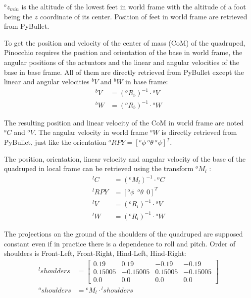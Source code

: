 \documentclass[a4paper,11pt]{article}
\newcommand{\fM}[2]{{}^{#1}\!M_{#2}}
\begin{document}

${}^o\!z_{min}$ is the altitude of the lowest feet in world frame with the altitude of a foot being the $z$ coordinate of its center. Position of feet in world frame are retrieved from PyBullet.

 
To get the position and velocity of the center of mass (CoM) of the quadruped, Pinocchio requires the position and orientation of the base in world frame, the angular positions of the actuators and the linear and angular velocities of the base in base frame. All of them are directly retrieved from PyBullet except the linear and angular velocities ${}^b\!V$ and ${}^b\!W$ in base frame: %
\begin{align}
{}^bV &= ({}^o\!R_b)^{-1} \cdot {}^oV \\
{}^bW &= ({}^o\!R_b)^{-1} \cdot {}^oW
\end{align}  

The resulting position and linear velocity of the CoM in world frame are noted ${}^o\!C$ and ${}^o\!V$. The angular velocity in world frame ${}^oW$ is directly retrieved from PyBullet, just like the orientation ${}^o\!RPY = [{}^o\!\phi ~ {}^o\!\theta ~ {}^o\!\psi]^T$.

The position, orientation, linear velocity and angular velocity of the base of the quadruped in local frame can be retrieved using the transform $\fM{o}{l}$ :
\begin{align}
{}^l\!C &= (\fM{o}{l})^{-1} \cdot {}^o\!C \\
{}^l\!RPY &= [{}^o\phi~~{}^o\theta~~0]^T \\
{}^l\!V &= ({}^o\!R_l)^{-1} \cdot {}^o\!V \\
{}^l\!W &= ({}^o\!R_l)^{-1} \cdot {}^o\!W
\end{align}

The projections on the ground of the shoulders of the quadruped are supposed constant even if in practice there is a dependence to roll and pitch. Order of shoulders is Front-Left, Front-Right, Hind-Left, Hind-Right:
\begin{align}
{}^l\!shoulders &= \begin{bmatrix} 0.19 & 0.19 & -0.19 & -0.19 \\ 0.15005 & -0.15005 & 0.15005 & -0.15005 \\ 0.0 & 0.0 & 0.0 & 0.0 \end{bmatrix} \\
{}^o\!shoulders &= \fM{o}{l} \cdot {}^l\!shoulders
\end{align}  
\end{document}
